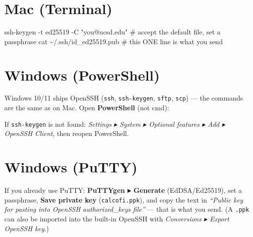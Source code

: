 \documentclass[
  letterpaper,
  DIV=11,
  numbers=noendperiod]{scrreprt}
\newenvironment{Shaded}{\begin{snugshade}}{\end{snugshade}}
\newcommand{\AttributeTok}[1]{\textcolor[rgb]{0.40,0.45,0.13}{#1}}
\newcommand{\CommentTok}[1]{\textcolor[rgb]{0.37,0.37,0.37}{#1}}
\newcommand{\FunctionTok}[1]{\textcolor[rgb]{0.28,0.35,0.67}{#1}}
\newcommand{\NormalTok}[1]{\textcolor[rgb]{0.00,0.23,0.31}{#1}}
\newcommand{\OperatorTok}[1]{\textcolor[rgb]{0.37,0.37,0.37}{#1}}
\newcommand{\StringTok}[1]{\textcolor[rgb]{0.13,0.47,0.30}{#1}}
\newcommand{\VariableTok}[1]{\textcolor[rgb]{0.07,0.07,0.07}{#1}}
\begin{document}
\section{Mac (Terminal)}

\begin{Shaded}
\begin{Highlighting}[]
\FunctionTok{ssh{-}keygen} \AttributeTok{{-}t}\NormalTok{ ed25519 }\AttributeTok{{-}C} \StringTok{"you@ucsd.edu"}      \CommentTok{\# accept the default file, set a passphrase}
\FunctionTok{cat}\NormalTok{ \textasciitilde{}/.ssh/id\_ed25519.pub                      }\CommentTok{\# this ONE line is what you send}
\end{Highlighting}
\end{Shaded}

\section{Windows (PowerShell)}

Windows 10/11 ships OpenSSH (\texttt{ssh}, \texttt{ssh-keygen},
\texttt{sftp}, \texttt{scp}) --- the commands are the same as on Mac.
Open \textbf{PowerShell} (not cmd):

\begin{Shaded}
\end{Shaded}

If \texttt{ssh-keygen} is not found: \emph{Settings ▸ System ▸ Optional
features ▸ Add ▸ OpenSSH Client}, then reopen PowerShell.

\section{Windows (PuTTY)}

If you already use PuTTY: \textbf{PuTTYgen ▸ Generate} (EdDSA/Ed25519),
set a passphrase, \textbf{Save private key} (\texttt{calcofi.ppk}), and
copy the text in \emph{``Public key for pasting into OpenSSH
authorized\_keys file''} --- that is what you send. (A \texttt{.ppk} can
also be imported into the built-in OpenSSH with \emph{Conversions ▸
Export OpenSSH key}.)
\end{document}
